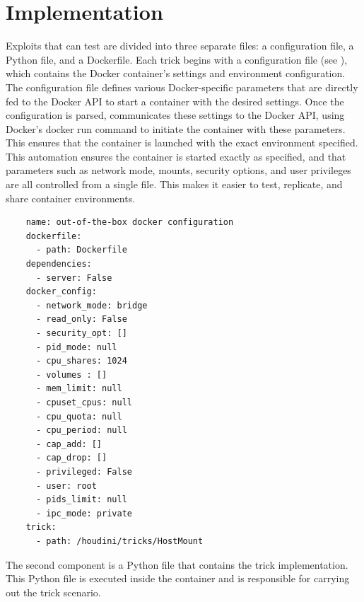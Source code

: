 \section{Implementation}
\label{sec:implementation}

Exploits that \houdini can test are divided into three separate files: a configuration file, a Python file, and a Dockerfile. Each \houdini trick begins with a configuration file (see ), which contains the Docker container's settings and environment configuration. The configuration file defines various Docker-specific parameters that are directly fed to the Docker API to start a container with the desired settings. Once the configuration is parsed, \houdini communicates these settings to the Docker API, using Docker's docker run command to initiate the container with these parameters. This ensures that the container is launched with the exact environment specified. This automation ensures the container is started exactly as specified, and that parameters such as network mode, mounts, security options, and user privileges are all controlled from a single file. This makes it easier to test, replicate, and share container environments.


\begin{listing}[h]
  \caption{Configuration file for a default Docker out-of-the-box security settings applied when a container is launched.}
  \label{lst:configuration-file}
  \begin{verbatim}
    name: out-of-the-box docker configuration
    dockerfile:
      - path: Dockerfile
    dependencies:
      - server: False
    docker_config: 
      - network_mode: bridge
      - read_only: False
      - security_opt: []
      - pid_mode: null
      - cpu_shares: 1024
      - volumes : []
      - mem_limit: null
      - cpuset_cpus: null
      - cpu_quota: null
      - cpu_period: null
      - cap_add: []
      - cap_drop: []
      - privileged: False
      - user: root
      - pids_limit: null
      - ipc_mode: private
    trick:
      - path: /houdini/tricks/HostMount
  \end{verbatim}
\end{listing}



The second component is a Python file that contains the trick implementation. This Python file is executed inside the container and is responsible for carrying out the trick scenario.


